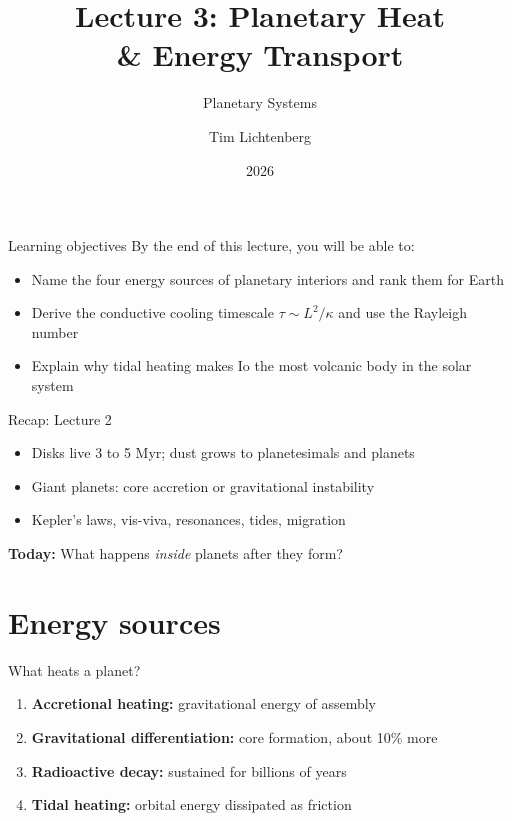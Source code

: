 \documentclass[aspectratio=169, 11pt]{beamer}
\title[Lecture 3: Heat \& Energy Transport]{Lecture 3: Planetary Heat\\\& Energy Transport}
\subtitle{Planetary Systems}
\author[L3]{Tim Lichtenberg}
\institute{Kapteyn Astronomical Institute\\University of Groningen}
\date{2026}
\begin{document}
\begin{frame}
  \titlepage
\end{frame}

\begin{frame}{Learning objectives}
  By the end of this lecture, you will be able to:
  \vskip8pt
  \begin{itemize}
    \item Name the four energy sources of planetary interiors and rank them for Earth
    \item Derive the conductive cooling timescale $\tau \sim L^2/\kappa$ and use the Rayleigh number
    \item Explain why tidal heating makes Io the most volcanic body in the solar system
  \end{itemize}
\end{frame}

\begin{frame}{Recap: Lecture 2}
  \begin{itemize}
    \item Disks live 3 to 5 Myr; dust grows to planetesimals and planets
    \item Giant planets: core accretion or gravitational instability
    \item Kepler's laws, vis-viva, resonances, tides, migration
  \end{itemize}
  \vskip8pt
  \textbf{Today:} What happens \textit{inside} planets after they form?
\end{frame}


\section{Energy sources}

\begin{frame}{What heats a planet?}
  \begin{enumerate}
    \item \textbf{Accretional heating:} gravitational energy of assembly
    \item \textbf{Gravitational differentiation:} core formation, about 10\% more
    \item \textbf{Radioactive decay:} sustained for billions of years
    \item \textbf{Tidal heating:} orbital energy dissipated as friction
  \end{enumerate}
  \vskip10pt
\end{frame}
\end{document}
